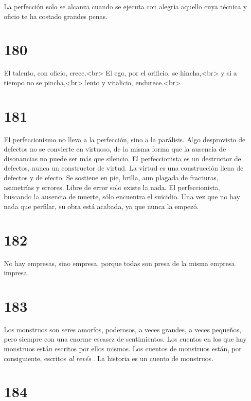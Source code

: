 \documentclass[a4paper,11pt,openright,twocolumn]{book}
\begin{document}
La perfección solo se alcanza cuando se ejecuta con alegría aquello cuya técnica y oficio te ha costado grandes penas. 


\section*{180}

El talento, con oficio, crece.<br>
El ego, por el orificio, se hincha,<br>
y si a tiempo no se pincha,<br>
lento y vitalicio, endurece.<br>

\section*{181}

El perfeccionismo no lleva a la perfección, sino a la parálisis.
Algo desprovisto de defectos no se convierte en virtuoso, 
de la misma forma que la ausencia de disonancias no
puede ser más que silencio.
El perfeccionista es un destructor de defectos, nunca un constructor de virtud.
La virtud es una construcción llena de defectos y de efecto.
Se sostiene en pie, brilla, aun plagada de fracturas, asimetrías y errores.
Libre de error solo existe la nada.
El perfeccionista, buscando la ausencia de muerte, sólo encuentra el suicidio.
Una vez que no hay nada que perfilar, su obra está acabada,
ya que nunca la empezó. 

\section*{182}

No hay empresas, sino empresa, porque todas son presa de la misma empresa impresa.

\section*{183}

Los monstruos son seres amorfos, poderosos, a veces grandes, a veces pequeños,
pero siempre con una enorme escasez de sentimientos.
Los cuentos en los que hay monstruos están escritos
por ellos mismos.
Los cuentos de monstruos están, por consiguiente, escritos {\it al revés}  .
La historia es un cuento de monstruos.

\section*{184}
\end{document}
